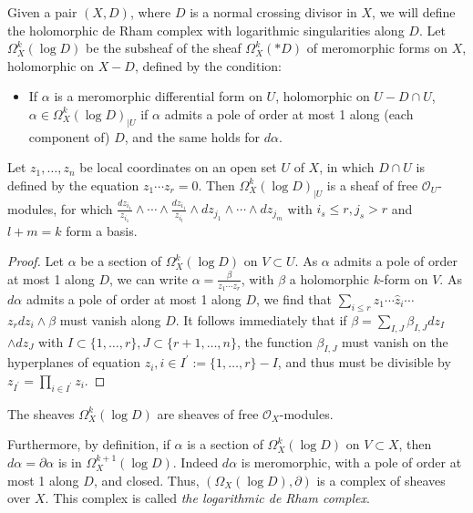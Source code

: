 \documentclass[lang=en,12pt]{beautybook}
\begin{document}
Given a pair $(X, D)$, where $D$ is a normal crossing divisor in $X$, we will define the holomorphic de Rham complex with logarithmic singularities along $D$.
Let $\Omega_X^k(\log D)$ be the subsheaf of the sheaf $\Omega_X^k(* D)$ of meromorphic forms on $X$, holomorphic on $X-D$, defined by the condition:
\begin{itemize}
  \item If $\alpha$ is a meromorphic differential form on $U$, holomorphic on $U-D \cap U$, $\alpha \in \Omega_X^k(\log D)_{\mid U}$ if $\alpha$ admits a pole of order at most 1 along (each component of) $D$, and the same holds for $d \alpha$.
\end{itemize}
\begin{lemma}[][][lem:]
  Let $z_1, \ldots, z_n$ be local coordinates on an open set $U$ of $X$, in which $D \cap U$ is defined by the equation $z_1 \cdots z_r=0$. Then $\Omega_X^k(\log D)_{\mid U}$ is a sheaf of free $\mathcal{O}_U$-modules, for which $\frac{d z_{i_1}}{z_{i_1}} \wedge \cdots \wedge \frac{d z_{i_1}}{z_{i_l}} \wedge d z_{j_1} \wedge \cdots \wedge d z_{j_m}$ with $i_s \leq r, j_s>r$ and $l+m=k$ form a basis.
\end{lemma}
\begin{proof}
  Let $\alpha$ be a section of $\Omega_X^k(\log D)$ on $V \subset U$. As $\alpha$ admits a pole of order at most 1 along $D$, we can write $\alpha=\frac{\beta}{z_1 \cdots z_r}$, with $\beta$ a holomorphic $k$-form on $V$. As $d \alpha$ admits a pole of order at most 1 along $D$, we find that $\sum_{i \leq r} z_1 \cdots \hat{z}_i \cdots$ $z_r d z_i \wedge \beta$ must vanish along $D$. It follows immediately that if $\beta=\sum_{I, J} \beta_{I, J} d z_I$ $\wedge d z_J$ with $I \subset\{1, \ldots, r\}, J \subset\{r+1, \ldots, n\}$, the function $\beta_{I, J}$ must vanish on the hyperplanes of equation $z_i, i \in I^{\prime}:=\{1, \ldots, r\}-I$, and thus must be divisible by $z_{I^{\prime}}=\prod_{i \in I^{\prime}} z_i$.
\end{proof}

\begin{corollary}[][][cor:8.17]
  The sheaves $\Omega_X^k(\log D)$ are sheaves of free $\mathcal{O}_X$-modules.
\end{corollary}

Furthermore, by definition, if $\alpha$ is a section of $\Omega_X^k(\log D)$ on $V \subset X$, then $d \alpha=\partial \alpha$ is in $\Omega_X^{k+1}(\log D)$. Indeed $d \alpha$ is meromorphic, with a pole of order at most 1 along $D$, and closed. Thus, $\left(\Omega_X(\log D), \partial\right)$ is a complex of sheaves over $X$. This complex is called \textit{the logarithmic de Rham complex}.
\end{document}
